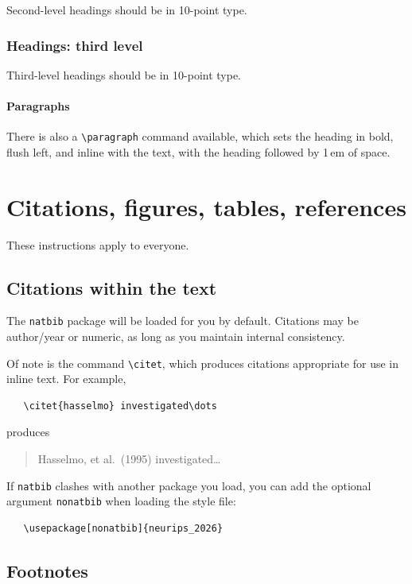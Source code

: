 \documentclass{article}
\begin{document}
Second-level headings should be in 10-point type.


\subsubsection{Headings: third level}


Third-level headings should be in 10-point type.


\paragraph{Paragraphs}


There is also a \verb+\paragraph+ command available, which sets the heading in
bold, flush left, and inline with the text, with the heading followed by 1\,em
of space.


\section{Citations, figures, tables, references}
\label{others}


These instructions apply to everyone.


\subsection{Citations within the text}


The \verb+natbib+ package will be loaded for you by default.  Citations may be
author/year or numeric, as long as you maintain internal consistency.  

Of note is the command \verb+\citet+, which produces citations appropriate for
use in inline text.  For example,
\begin{verbatim}
   \citet{hasselmo} investigated\dots
\end{verbatim}
produces
\begin{quote}
  Hasselmo, et al.\ (1995) investigated\dots
\end{quote}


If \verb+natbib+ clashes with another package you load, you can add the optional
argument \verb+nonatbib+ when loading the style file:
\begin{verbatim}
   \usepackage[nonatbib]{neurips_2026}
\end{verbatim}


\subsection{Footnotes}
\end{document}
